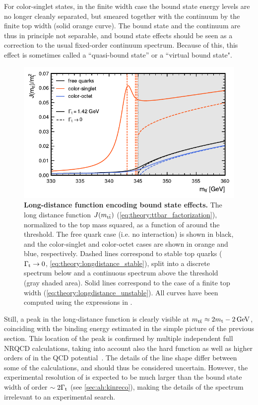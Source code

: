 For color-singlet states, in the finite width case the bound state energy levels are no longer cleanly separated, but smeared together with the \ttbar continuum by the finite top width (solid orange curve). The bound state and the \ttbar continuum are thus in principle not separable, and bound state effects should be seen as a correction to the usual fixed-order \ttbar continuum spectrum. Because of this, this effect is sometimes called a ``quasi-bound state'' or a ``virtual bound state".

\begin{figure}[t]
    \centering
    \includegraphics[width=0.85\linewidth]{figures/greensfunction.pdf}
    \caption{\textbf{Long-distance function encoding \ttbar bound state effects.} The long distance function $J(m_{\mathrm{t \bar{t}}})$ (\cref{eq:theory:ttbar_factorization}), normalized to the top mass squared, as a function of \mtt around the \ttbar threshold. The free quark case (i.e. no interaction) is shown in black, and the color-singlet and color-octet cases are shown in orange and blue, respectively. Dashed lines correspond to stable top quarks ($\Gamma_{\mathrm{t}} \rightarrow 0$, \cref{eq:theory:longdistance_stable}), split into a discrete spectrum below and a continuous spectrum above the \ttbar threshold (gray shaded area). Solid lines correspond to the case of a finite top width (\cref{eq:theory:longdistance_unstable}). All curves have been computed using the expressions in .}
    \label{fig:theory:greensfunction}
\end{figure}

Still, a peak in the long-distance function is clearly visible at $\mtt \approx 2 \mt - \SI{2}{\GeV}$, coinciding with the binding energy estimated in the simple picture of the previous section. This location of the peak is confirmed by multiple independent full NRQCD calculations, taking into account also the hard function as well as higher orders of \alphas in the QCD potential~\cite{Fadin:1990wx,Kiyo:2008bv,Sumino:2010bv,Ju:2020otc,Garzelli:2024uhe}. The details of the line shape differ between some of the calculations, and should thus be considered uncertain. However, the experimental resolution of \mtt is expected to be much larger than the bound state width of order $\sim 2 \Gamma_{\mathrm{t}}$ (see \cref{sec:ah:kinreco}), making the details of the spectrum irrelevant to an experimental search.

